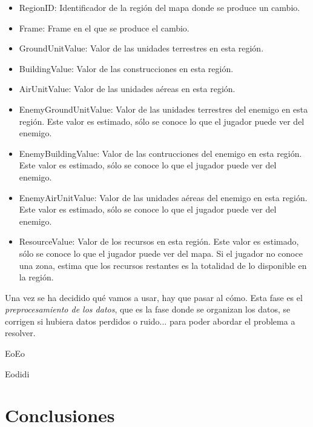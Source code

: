 \documentclass[a4paper,11pt]{book}\usepackage[]{graphicx}\usepackage[]{color}
\begin{document}
\begin{itemize}
\begin{itemize}
    \item RegionID: Identificador de la región del mapa donde se produce un cambio.
    \item Frame: Frame en el que se produce el cambio.
    \item GroundUnitValue: Valor de las unidades terrestres en esta región.
    \item BuildingValue: Valor de las construcciones en esta región.
    \item AirUnitValue: Valor de las unidades aéreas en esta región.
    \item EnemyGroundUnitValue: Valor de las unidades terrestres del enemigo en esta región. Este valor es estimado, sólo se conoce lo que el jugador puede ver del enemigo.
    \item EnemyBuildingValue: Valor de las contrucciones del enemigo en esta región. Este valor es estimado, sólo se conoce lo que el jugador puede ver del enemigo.
    \item EnemyAirUnitValue: Valor de las unidades aéreas del enemigo en esta región. Este valor es estimado, sólo se conoce lo que el jugador puede ver del enemigo.
    \item ResourceValue: Valor de los recursos en esta región. Este valor es estimado, sólo se conoce lo que el jugador puede ver del mapa. Si el jugador no conoce una zona, estima que los recursos restantes es la totalidad de lo disponible en la región.
  \end{itemize}
\end{itemize}

Una vez se ha decidido qué vamos a usar, hay que pasar al cómo. Esta fase es el \emph{preprocesamiento de los datos}, que es la fase donde se organizan los datos, se corrigen si hubiera datos perdidos o ruido... para poder abordar el problema a resolver.

EoEo

Eodidi


\chapter{Conclusiones} 

%
%
%
%
%
%
\chapter*{}
\thispagestyle{empty}

{}

\end{document}
